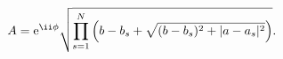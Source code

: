 \begin{equation}
A={\rm e}^{\ii\phi}\sqrt{\prod\limits_{s=1}^N\left( b-b_s+
\sqrt{(b-b_s)^2+|a-a_s|^2}\right)}.
\label{ABegyenlet}
\end{equation}


